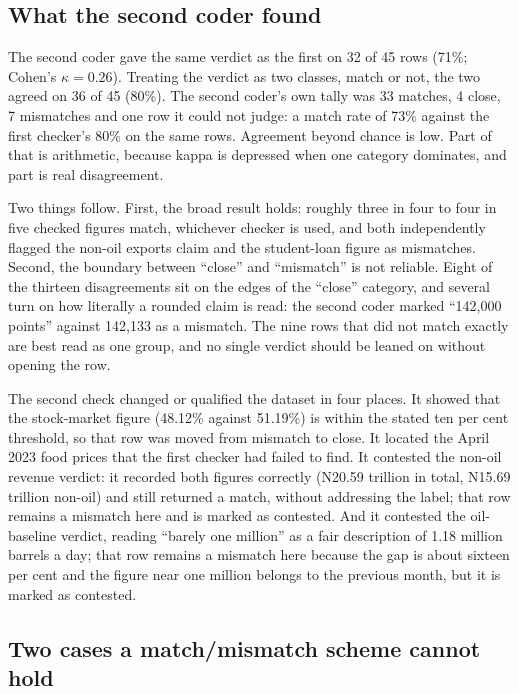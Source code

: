 \documentclass[11pt]{article}
\newcommand{\N}{N}
\begin{document}
\subsection{What the second coder found}
\label{sec:second}

The second coder gave the same verdict as the first on 32 of 45 rows (71\%; Cohen's $\kappa = 0.26$). Treating the verdict as two classes, match or not, the two agreed on 36 of 45 (80\%). The second coder's own tally was 33 matches, 4 close, 7 mismatches and one row it could not judge: a match rate of 73\% against the first checker's 80\% on the same rows. Agreement beyond chance is low. Part of that is arithmetic, because kappa is depressed when one category dominates, and part is real disagreement.

Two things follow. First, the broad result holds: roughly three in four to four in five checked figures match, whichever checker is used, and both independently flagged the non-oil exports claim and the student-loan figure as mismatches. Second, the boundary between ``close'' and ``mismatch'' is not reliable. Eight of the thirteen disagreements sit on the edges of the ``close'' category, and several turn on how literally a rounded claim is read: the second coder marked ``142,000 points'' against 142,133 as a mismatch. The nine rows that did not match exactly are best read as one group, and no single verdict should be leaned on without opening the row.

The second check changed or qualified the dataset in four places. It showed that the stock-market figure (48.12\% against 51.19\%) is within the stated ten per cent threshold, so that row was moved from mismatch to close. It located the April 2023 food prices that the first checker had failed to find. It contested the non-oil revenue verdict: it recorded both figures correctly (\N 20.59 trillion in total, \N 15.69 trillion non-oil) and still returned a match, without addressing the label; that row remains a mismatch here and is marked as contested. And it contested the oil-baseline verdict, reading ``barely one million'' as a fair description of 1.18 million barrels a day; that row remains a mismatch here because the gap is about sixteen per cent and the figure near one million belongs to the previous month, but it is marked as contested.

\subsection{Two cases a match/mismatch scheme cannot hold}
\end{document}
